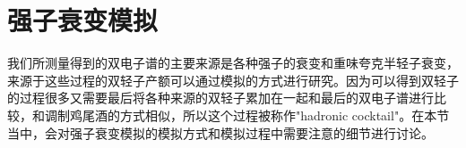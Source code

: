 \section{强子衰变模拟}
\label{ch:cocktail}
我们所测量得到的双电子谱的主要来源是各种强子的衰变和重味夸克半轻子衰变，来源于这些过程的双轻子产额可以通过模拟的方式进行研究。因为可以得到双轻子的过程很多又需要最后将各种来源的双轻子累加在一起和最后的双电子谱进行比较，和调制鸡尾酒的方式相似，所以这个过程被称作"hadronic cocktail"。在本节当中，会对强子衰变模拟的模拟方式和模拟过程中需要注意的细节进行讨论。




